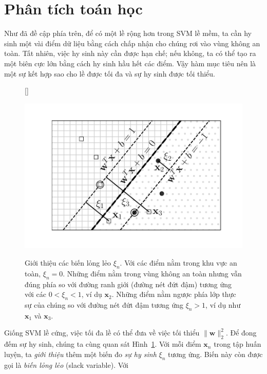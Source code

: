  
 
\section{Phân tích toán học}
 
Như đã đề cập phía trên, để có một lề rộng hơn trong SVM lề mềm, ta cần {hy sinh} một vài điểm dữ liệu bằng cách chấp nhận
cho chúng rơi vào vùng {không an toàn}. Tất nhiên, việc {hy sinh}
này cần được hạn chế; nếu không, ta có thể tạo ra một biên cực lớn bằng cách
{hy sinh} hầu hết các điểm. Vậy hàm mục tiêu nên là một sự kết hợp sao cho lề được tối đa và sự hy sinh được tối thiểu.
 
\begin{figure}[t]
    [\FBwidth]
    {\caption{ 
    Giới thiệu các biến lỏng lẻo $\xi_n$. Với các điểm nằm trong {khu vực an
    toàn}, $\xi_n = 0$.
    Những điểm nằm trong vùng
    không an toàn nhưng vẫn đúng phía so với đường ranh giới (đường nét đứt
    đậm) tương ứng với các $0 < \xi_n < 1$, ví dụ $\mathbf{x}_2$. Những điểm
    nằm ngược phía lớp thực sự của chúng so với đường nét đứt đậm tương ứng $\xi_n > 1$, ví dụ như $\mathbf{x}_1$ và $\mathbf{x}_3$.
    }
    \label{fig:20_2}}
    { %
    \includegraphics[width=.55\textwidth]{ebookML_src/src/softmargin_svm/ssvm3.pdf}
    }
\end{figure}
Giống SVM lề cứng, việc tối đa lề có thể đưa
về việc tối thiểu $\|\mathbf{w}\|_2^2$. Để đong đếm sự hy sinh, chúng ta cùng quan sát Hình~\ref{fig:20_2}. Với mỗi điểm $\mathbf{x}_n$ trong tập huấn luyện, ta \textit{giới thiệu} thêm một biến đo \textit{sự hy
sinh} $\xi_n$ tương ứng. Biến này còn được gọi là \textit{biến lỏng lẻo} (slack variable). Với
